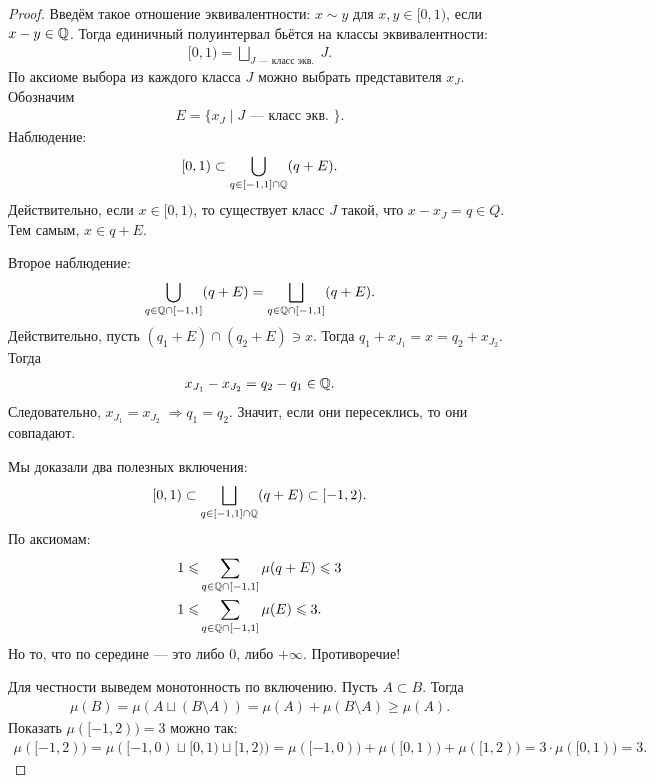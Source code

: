 \documentclass[a4paper,12pt]{article}
\theoremstyle{definition}
\theoremstyle{plain}
\theoremstyle{plain}
\theoremstyle{plain}
\theoremstyle{plain}
\theoremstyle{definition}
\theoremstyle{definition}
\theoremstyle{definition}
\theoremstyle{definition}
\theoremstyle{definition}
\theoremstyle{definition}
\theoremstyle{plain}
\theoremstyle{plain}
\theoremstyle{plain}
\theoremstyle{plain}
\theoremstyle{definition}
\theoremstyle{definition}
\theoremstyle{definition}
\theoremstyle{definition}
\theoremstyle{definition}
\newcommand{\Q}{\ensuremath \mathbb{Q}}
\begin{document}
\begin{proof}
 Введём такое отношение эквивалентности: $ x \sim y $ для $ x,y \in [0, 1) $, если $ x-y \in \Q $. Тогда единичный полуинтервал бьётся на классы эквивалентности:
 \begin{align*}
  [0, 1) = \bigsqcup_{J \text{ --- класс экв. }} J
 .\end{align*} По аксиоме выбора из каждого класса $ J $ можно выбрать представителя $ x_J $. Обозначим
 \begin{align*}
  E = \{ x_J \mid J \text { --- класс экв. } \}
 .\end{align*} Наблюдение:
 \begin{align*}
  [0, 1) \subset \bigcup_{q \in [-1, 1] \cap \Q} (q + E)
 .\end{align*} Действительно, если $ x \in [0, 1) $, то существует класс $ J $ такой, что $ x - x_J = q \in Q $. Тем самым, $ x \in q + E $.

 Второе наблюдение:
 \begin{align*}
  \bigcup_{q \in \Q \cap [-1, 1]} (q + E) = \bigsqcup_{q \in \Q \cap [-1, 1]} (q + E)
 .\end{align*} Действительно, пусть $ (q_1 + E) \cap (q_2 + E) \ni x $. Тогда $ q_1 + x_{J_1} = x = q_2 + x_{J_2} $. Тогда
 \begin{align*}
  x_{J_1} - x_{J_2} = q_2 - q_1 \in \Q
 .\end{align*} Следовательно, $ x_{J_1} = x_{J_2} \;\Longrightarrow q_1 = q_2$. Значит, если они пересеклись, то они совпадают.
 
 Мы доказали два полезных включения:
 \begin{align*}
  [0, 1) \subset \bigsqcup_{q \in [-1, 1] \cap \Q} (q + E) \subset [-1, 2)
 .\end{align*} По аксиомам:
 \begin{align*}
  1 \leqslant &\sum_{q \in \Q \cap [-1, 1]} \mu(q + E) \leqslant 3 \\
  1 \leqslant &\sum_{q \in \Q \cap [-1, 1]} \mu(E) \leqslant 3 
 .\end{align*} Но то, что по середине --- это либо $ 0 $, либо $ +\infty $. Противоречие! 

 Для честности выведем монотонность по включению. Пусть $ A \subset B $. Тогда
 \begin{align*}
  \mu(B) = \mu(A \sqcup (B \setminus A)) = \mu(A) + \mu(B \setminus A) \geqslant \mu(A)
 .\end{align*} Показать $ \mu([-1, 2)) = 3 $ можно так:
 \begin{align*}
  \mu([-1, 2)) = \mu([-1, 0) \sqcup [0, 1) \sqcup [1, 2)) =\mu([-1, 0)) + \mu([0, 1)) + \mu([1, 2)) = 3 \cdot \mu([0, 1)) = 3
 .\end{align*}
\end{proof}
\end{document}
